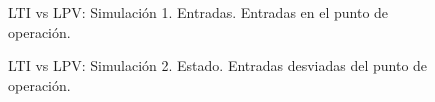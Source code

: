 \documentclass[a4paper, 10pt, onecolumn,journal]{ieeeconf}
\begin{document}
\begin{figure}[thpb]
	\centering
	\begin{adjustbox}{max width=\columnwidth}
	\end{adjustbox}
	\caption{LTI vs LPV: Simulación 1. Entradas. Entradas en el punto de operación.}
	\label{simulación 1 entradas}
\end{figure}

\begin{figure}[thpb]
	\centering
	\begin{adjustbox}{max width=\columnwidth}
	\end{adjustbox}
	\caption{LTI vs LPV: Simulación 2. Estado. Entradas desviadas del punto de operación.}
	\label{simulación 2 estado}
\end{figure}
\end{document}
